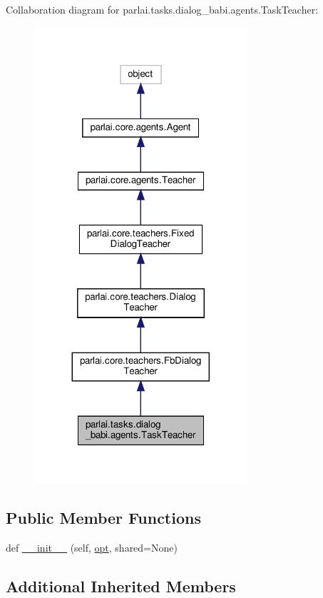 Collaboration diagram for parlai.\+tasks.\+dialog\+\_\+babi.\+agents.\+Task\+Teacher\+:
\nopagebreak
\begin{figure}[H]
\begin{center}
\leavevmode
\includegraphics[width=224pt]{classparlai_1_1tasks_1_1dialog__babi_1_1agents_1_1TaskTeacher__coll__graph}
\end{center}
\end{figure}
\subsection*{Public Member Functions}
\begin{DoxyCompactItemize}
\item 
def \hyperlink{classparlai_1_1tasks_1_1dialog__babi_1_1agents_1_1TaskTeacher_a04ad8a9d7b96a3115bc3661bb875eeef}{\+\_\+\+\_\+init\+\_\+\+\_\+} (self, \hyperlink{classparlai_1_1core_1_1teachers_1_1FbDialogTeacher_af7a9ec497b9cd0292d7b8fa220da7c28}{opt}, shared=None)
\end{DoxyCompactItemize}
\subsection*{Additional Inherited Members}


